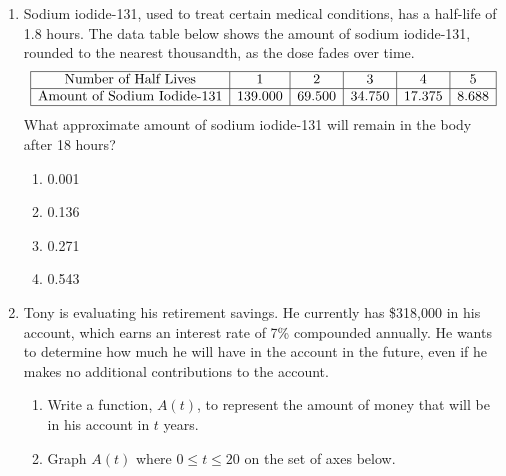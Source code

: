\documentclass[12pt, twoside]{article}
\begin{document}
\begin{enumerate}[itemsep=0.5cm]
\item Sodium iodide-131, used to treat certain medical conditions, has a half-life of 1.8 hours. The data table below shows the amount of sodium iodide-131, rounded to the nearest thousandth, as the dose fades over time.
\[
\begin{array}{|c|c|c|c|c|c|}
\hline
\text{Number of Half Lives} & 1 & 2 & 3 & 4 & 5 \\
\hline
\text{Amount of Sodium Iodide-131} & 139.000 & 69.500 & 34.750 & 17.375 & 8.688 \\
\hline
\end{array}
\]
What approximate amount of sodium iodide-131 will remain in the body after 18 hours?
\begin{enumerate}
    \item 0.001
    \item 0.136
    \item 0.271
    \item 0.543
\end{enumerate}

\item Tony is evaluating his retirement savings. He currently has \$318,000 in his account, which earns an interest rate of 7\% compounded annually. He wants to determine how much he will have in the account in the future, even if he makes no additional contributions to the account.
    \begin{enumerate}
        \item Write a function, \( A(t) \), to represent the amount of money that will be in his account in \( t \) years.
        \item Graph \( A(t) \) where \( 0 \leq t \leq 20 \) on the set of axes below.
    \end{enumerate}
    \begin{center}
    \end{center}

\end{enumerate}
\end{document}
